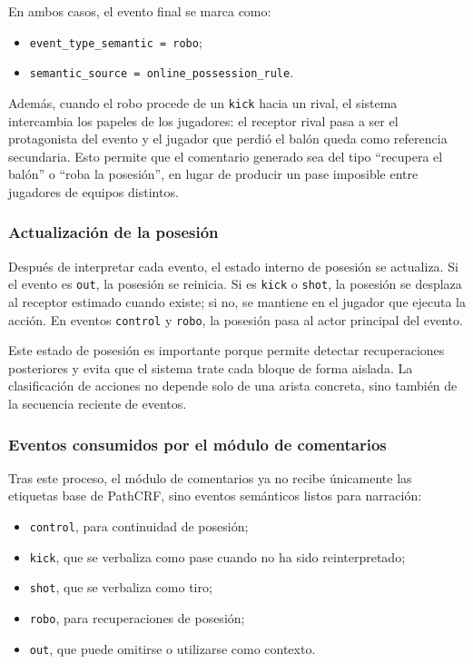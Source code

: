 En ambos casos, el evento final se marca como:

\begin{itemize}
    \item \texttt{event\_type\_semantic = robo};
    \item \texttt{semantic\_source = online\_possession\_rule}.
\end{itemize}

Además, cuando el robo procede de un \texttt{kick} hacia un rival, el sistema intercambia los papeles de los jugadores: el receptor rival pasa a ser el protagonista del evento y el jugador que perdió el balón queda como referencia secundaria. Esto permite que el comentario generado sea del tipo ``recupera el balón'' o ``roba la posesión'', en lugar de producir un pase imposible entre jugadores de equipos distintos.

\subsubsection{Actualización de la posesión}

Después de interpretar cada evento, el estado interno de posesión se actualiza. Si el evento es \texttt{out}, la posesión se reinicia. Si es \texttt{kick} o \texttt{shot}, la posesión se desplaza al receptor estimado cuando existe; si no, se mantiene en el jugador que ejecuta la acción. En eventos \texttt{control} y \texttt{robo}, la posesión pasa al actor principal del evento.

Este estado de posesión es importante porque permite detectar recuperaciones posteriores y evita que el sistema trate cada bloque de forma aislada. La clasificación de acciones no depende solo de una arista concreta, sino también de la secuencia reciente de eventos.

\subsubsection{Eventos consumidos por el módulo de comentarios}

Tras este proceso, el módulo de comentarios ya no recibe únicamente las etiquetas base de PathCRF, sino eventos semánticos listos para narración:

\begin{itemize}
    \item \texttt{control}, para continuidad de posesión;
    \item \texttt{kick}, que se verbaliza como pase cuando no ha sido reinterpretado;
    \item \texttt{shot}, que se verbaliza como tiro;
    \item \texttt{robo}, para recuperaciones de posesión;
    \item \texttt{out}, que puede omitirse o utilizarse como contexto.
\end{itemize}

